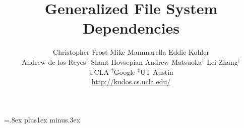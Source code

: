 \documentclass[9pt,twocolumn,letterpaper]{article}
\title{\sffamily\textbf{Generalized File System Dependencies}}
\author{\sffamily
	Christopher Frost\assast\asscontact
	\qquad Mike Mammarella\assast\asscontact
	\qquad Eddie Kohler\assast \\
	\sffamily Andrew de los Reyes$^\dag$
	\quad Shant Hovsepian\assast
	\quad Andrew Matsuoka$^\ddag$
	\quad Lei Zhang$^\dag$ \\
	\sffamily \fontsize{10pt}{10pt}\selectfont
	\assast UCLA
	\qquad $^\dag$Google
	\qquad $^\ddag$UT Austin \\
	\url{http://kudos.cs.ucla.edu/} \\
}
\date{}
\begin{document}
\maketitle























\begin{footnotesize}
\bibsep=.8ex plus1ex minus.3ex


\end{footnotesize}
\label{lastpage}
\end{document}
